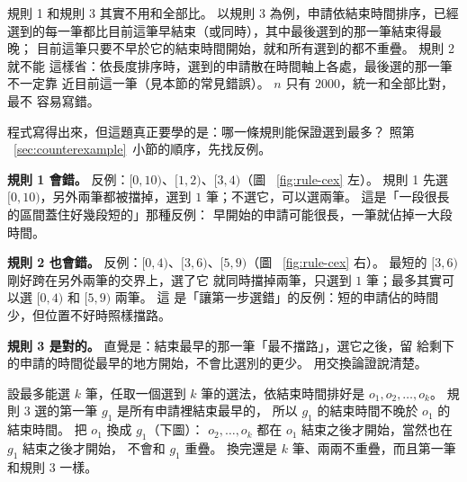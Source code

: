 規則 1 和規則 3 其實不用和全部比。 以規則 3 為例，申請依結束時間排序，已經
選到的每一筆都比目前這筆早結束（或同時），其中最後選到的那一筆結束得最晚；
目前這筆只要不早於它的結束時間開始，就和所有選到的都不重疊。 規則 2 就不能
這樣省：依長度排序時，選到的申請散在時間軸上各處，最後選的那一筆不一定靠
近目前這一筆（見本節的常見錯誤）。 $n$ 只有 $2000$，統一和全部比對，最不
容易寫錯。

程式寫得出來，但這題真正要學的是：哪一條規則能保證選到最多？ 照第
~\ref{sec:counterexample}~小節的順序，先找反例。

\textbf{規則 1 會錯。} 反例：$[0, 10)$、$[1, 2)$、$[3, 4)$（圖
~\ref{fig:rule-cex} 左）。 規則 1 先選 $[0, 10)$，另外兩筆都被擋掉，選到
$1$ 筆；不選它，可以選兩筆。 這是「一段很長的區間蓋住好幾段短的」那種反例：
早開始的申請可能很長，一筆就佔掉一大段時間。

\textbf{規則 2 也會錯。} 反例：$[0, 4)$、$[3, 6)$、$[5, 9)$（圖
~\ref{fig:rule-cex} 右）。 最短的 $[3, 6)$ 剛好跨在另外兩筆的交界上，選了它
就同時擋掉兩筆，只選到 $1$ 筆；最多其實可以選 $[0, 4)$ 和 $[5, 9)$ 兩筆。 這
是「讓第一步選錯」的反例：短的申請佔的時間少，但位置不好時照樣擋路。

\begin{center}
\label{fig:rule-cex}
\end{center}

\textbf{規則 3 是對的。} 直覺是：結束最早的那一筆「最不擋路」，選它之後，留
給剩下的申請的時間從最早的地方開始，不會比選別的更少。 用交換論證說清楚。

設最多能選 $k$ 筆，任取一個選到 $k$ 筆的選法，依結束時間排好是
$o_1, o_2, \ldots, o_k$。 規則 3 選的第一筆 $g_1$ 是所有申請裡結束最早的，
所以 $g_1$ 的結束時間不晚於 $o_1$ 的結束時間。 把 $o_1$ 換成 $g_1$（下圖）：
$o_2, \ldots, o_k$ 都在 $o_1$ 結束之後才開始，當然也在 $g_1$ 結束之後才開始，
不會和 $g_1$ 重疊。 換完還是 $k$ 筆、兩兩不重疊，而且第一筆和規則 3 一樣。

